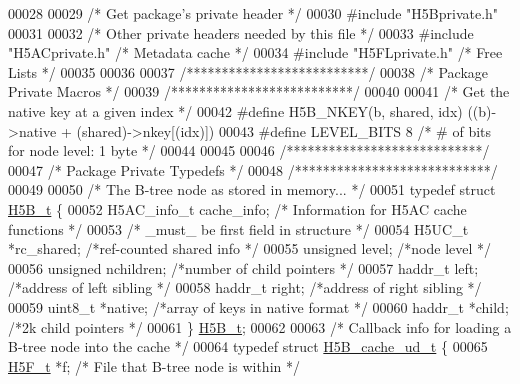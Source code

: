 \begin{DoxyCode}
00028 
00029 \textcolor{comment}{/* Get package's private header */}
00030 \textcolor{preprocessor}{#include "H5Bprivate.h"}
00031 
00032 \textcolor{comment}{/* Other private headers needed by this file */}
00033 \textcolor{preprocessor}{#include "H5ACprivate.h"}    \textcolor{comment}{/* Metadata cache           */}
00034 \textcolor{preprocessor}{#include "H5FLprivate.h"}        \textcolor{comment}{/* Free Lists                           */}
00035 
00036 
00037 \textcolor{comment}{/**************************/}
00038 \textcolor{comment}{/* Package Private Macros */}
00039 \textcolor{comment}{/**************************/}
00040 
00041 \textcolor{comment}{/* Get the native key at a given index */}
00042 \textcolor{preprocessor}{#define H5B\_NKEY(b, shared, idx)  ((b)->native + (shared)->nkey[(idx)])}
00043 \textcolor{preprocessor}{#define LEVEL\_BITS  8   }\textcolor{comment}{/* # of bits for node level: 1 byte */}\textcolor{preprocessor}{}
00044 
00045 
00046 \textcolor{comment}{/****************************/}
00047 \textcolor{comment}{/* Package Private Typedefs */}
00048 \textcolor{comment}{/****************************/}
00049 
00050 \textcolor{comment}{/* The B-tree node as stored in memory...  */}
00051 \textcolor{keyword}{typedef} \textcolor{keyword}{struct }\hyperlink{struct_h5_b__t}{H5B\_t} \{
00052     H5AC\_info\_t        cache\_info;     \textcolor{comment}{/* Information for H5AC cache functions */}
00053                                         \textcolor{comment}{/* \_must\_ be first field in structure */}
00054     H5UC\_t      *rc\_shared; \textcolor{comment}{/*ref-counted shared info        */}
00055     \textcolor{keywordtype}{unsigned}        level;      \textcolor{comment}{/*node level                 */}
00056     \textcolor{keywordtype}{unsigned}        nchildren;  \textcolor{comment}{/*number of child pointers       */}
00057     haddr\_t     left;       \textcolor{comment}{/*address of left sibling        */}
00058     haddr\_t     right;      \textcolor{comment}{/*address of right sibling       */}
00059     uint8\_t     *native;    \textcolor{comment}{/*array of keys in native format     */}
00060     haddr\_t     *child;     \textcolor{comment}{/*2k child pointers          */}
00061 \} \hyperlink{struct_h5_b__t}{H5B\_t};
00062 
00063 \textcolor{comment}{/* Callback info for loading a B-tree node into the cache */}
00064 \textcolor{keyword}{typedef} \textcolor{keyword}{struct }\hyperlink{struct_h5_b__cache__ud__t}{H5B\_cache\_ud\_t} \{
00065     \hyperlink{struct_h5_f__t}{H5F\_t} *f;                           \textcolor{comment}{/* File that B-tree node is within   */}

\end{DoxyCode}
